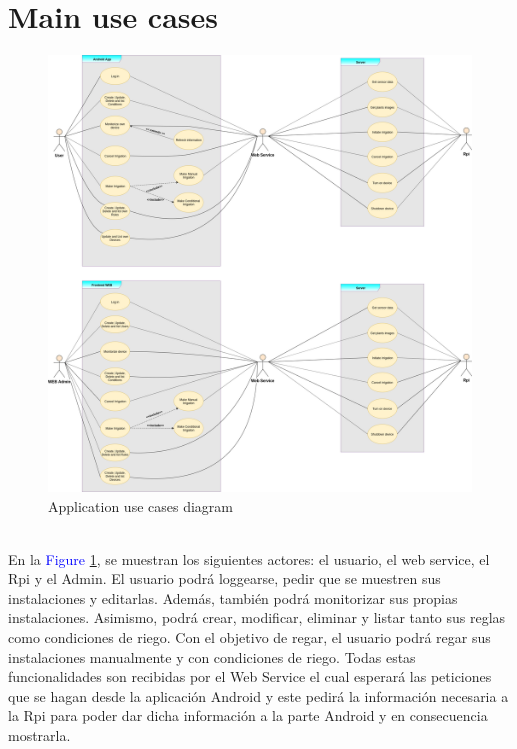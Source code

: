 \documentclass[11pt,a4paper]{article}
\begin{document}
\newpage

\section{Main use cases}
\begin{figure}[hbtp]
\centering
\includegraphics[scale=0.300,angle=0,origin=c]{DCU.png}
\caption{Application use cases diagram}
\label{figure2}
\end{figure} \newpage\leavevmode \\
En la \textcolor{blue}{Figure \ref{figure2}}, se muestran los siguientes actores: el usuario, el web service, el Rpi y el Admin.\newline\newline
El usuario podrá loggearse, pedir que se muestren sus instalaciones y editarlas. Además, también podrá monitorizar sus propias instalaciones. Asimismo, podrá crear, modificar, eliminar y listar tanto sus reglas como condiciones de riego. Con el objetivo de regar, el usuario podrá regar sus instalaciones manualmente y con condiciones de riego. Todas estas funcionalidades son recibidas por el Web Service el cual esperará las peticiones que se hagan desde la aplicación Android y este pedirá la información necesaria a la Rpi para poder dar dicha información a la parte Android y en consecuencia mostrarla. \newline\newline
\end{document}
